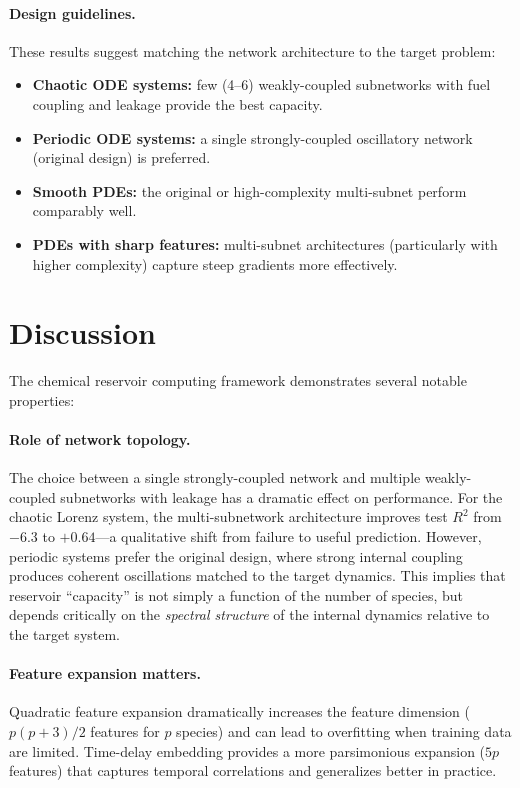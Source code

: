 \documentclass[11pt,twocolumn]{article}
\begin{document}
\paragraph{Design guidelines.}
These results suggest matching the network architecture to the target problem:
\begin{itemize}
  \item \textbf{Chaotic ODE systems:} few (4--6) weakly-coupled subnetworks
    with fuel coupling and leakage provide the best capacity.
  \item \textbf{Periodic ODE systems:} a single strongly-coupled oscillatory
    network (original design) is preferred.
  \item \textbf{Smooth PDEs:} the original or high-complexity multi-subnet
    perform comparably well.
  \item \textbf{PDEs with sharp features:} multi-subnet architectures
    (particularly with higher complexity) capture steep gradients more
    effectively.
\end{itemize}

\section{Discussion}
\label{sec:discussion}

The chemical reservoir computing framework demonstrates several notable
properties:

\paragraph{Role of network topology.}
The choice between a single strongly-coupled network and multiple
weakly-coupled subnetworks with leakage has a dramatic effect on
performance.  For the chaotic Lorenz system, the multi-subnetwork
architecture improves test $R^2$ from $-6.3$ to $+0.64$---a qualitative
shift from failure to useful prediction.  However, periodic systems
prefer the original design, where strong internal coupling produces
coherent oscillations matched to the target dynamics.  This implies
that reservoir ``capacity'' is not simply a function of the number of
species, but depends critically on the \emph{spectral structure} of the
internal dynamics relative to the target system.

\paragraph{Feature expansion matters.}
Quadratic feature expansion dramatically increases the feature dimension
($p(p+3)/2$ features for $p$ species) and can lead to overfitting when
training data are limited.  Time-delay embedding provides a more
parsimonious expansion ($5p$ features) that captures temporal correlations
and generalizes better in practice.
\end{document}
